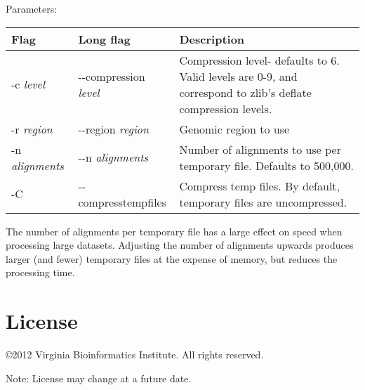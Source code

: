 \documentclass[11pt]{article}
\begin{document}
Parameters:
\begin{center}
\begin{tabular}{llp{3.5in}}
\hline
Flag&Long flag&Description\\ \hline
-c \textit{level}&{-}{-}compression \textit{level}&Compression level- defaults to 6. Valid levels are 0-9, and correspond to zlib's deflate compression levels. \\
-r \textit{region}&{-}{-}region \textit{region}&Genomic region to use\\
-n \textit{alignments}&{-}{-}n \textit{alignments}&Number of alignments to use per temporary file. Defaults to 500,000.\\
-C&{-}{-}compresstempfiles&Compress temp files. By default, temporary files are uncompressed.\\
\end{tabular}
\end{center}

The number of alignments per temporary file has a large effect on speed when processing large datasets. Adjusting the number of alignments upwards produces larger (and fewer) temporary files at the expense of memory, but reduces the processing time.

\section {License}
\copyright 2012 Virginia Bioinformatics Institute. All rights reserved.

Note: License may change at a future date.
\end{document}
